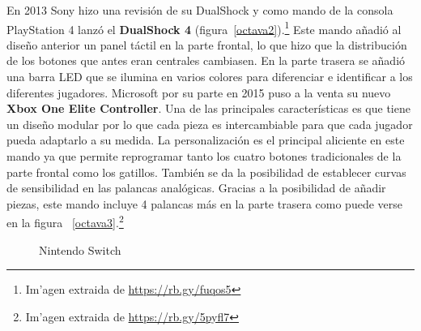 En 2013 Sony hizo una revisi\'on de su DualShock y como mando de la consola PlayStation 4 lanz\'o el \textbf{DualShock 4} (figura~\ref{octava2}).\footnote{Im'agen extraida de \url{https://rb.gy/fuqos5}} Este mando a\~nadi\'o al dise\~no anterior un panel t\'actil en la parte frontal, lo que hizo que la distribuci\'on de los botones que antes eran centrales cambiasen. En la parte trasera se a\~nadi\'o una barra LED que se ilumina en varios colores para diferenciar e identificar a los diferentes jugadores. Microsoft por su parte en 2015 puso a la venta su nuevo \textbf{Xbox One Elite Controller}. Una de las principales caracter\'isticas es que tiene un dise\~no modular por lo que cada pieza es intercambiable para que cada jugador pueda adaptarlo a su medida. La personalizaci\'on es el principal aliciente en este mando ya que permite reprogramar tanto los cuatro botones tradicionales de la parte frontal como los gatillos. Tambi\'en se da la posibilidad de establecer curvas de sensibilidad en las palancas anal\'ogicas. Gracias a la posibilidad de a\~nadir piezas, este mando incluye 4 palancas m\'as en la parte trasera como puede verse en la figura~ \ref{octava3}.\footnote{Im'agen extraida de \url{https://rb.gy/5pyfl7}}\\

\begin{figure}[t]

 \hfill
    
     \caption{Nintendo Switch}
     \label{fig:octava2}
   \end{figure}

